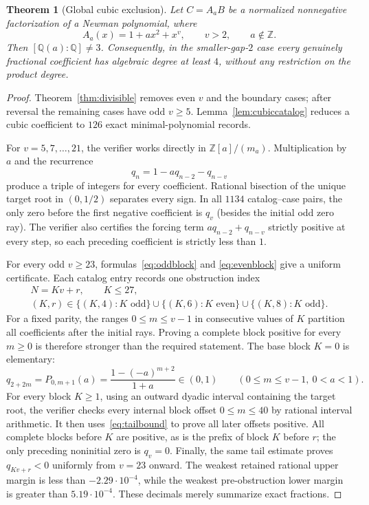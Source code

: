\documentclass[11pt]{article}
\newtheorem{theorem}{Theorem}[section]
\theoremstyle{remark}
\newcommand{\Q}{\mathbb Q}
\newcommand{\Z}{\mathbb Z}
\numberwithin{equation}{section}
\begin{document}
\begin{theorem}[Global cubic exclusion]\label{thm:globalcubic}
Let $C=A_aB$ be a normalized nonnegative factorization of a Newman polynomial,
where
\[
 A_a(x)=1+a x^2+x^v,\qquad v>2,\qquad a\notin\Z.
\]
Then $[\Q(a):\Q]\ne3$.  Consequently, in the smaller-gap-$2$ case every
genuinely fractional coefficient has algebraic degree at least $4$, without
any restriction on the product degree.
\end{theorem}
\begin{proof}
Theorem~\ref{thm:divisible} removes even $v$ and the boundary cases; after
reversal the remaining cases have odd $v\ge5$.  Lemma~\ref{lem:cubiccatalog}
reduces a cubic coefficient to $126$ exact minimal-polynomial records.

For $v=5,7,\ldots,21$, the verifier works directly in
$\Z[a]/(m_a)$.  Multiplication by $a$ and the recurrence
\[
 q_n=1-aq_{n-2}-q_{n-v}
\]
produce a triple of integers for every coefficient.  Rational bisection of
the unique target root in $(0,1/2)$ separates every sign.  In all $1134$
catalog--case pairs, the only zero before the first negative coefficient is
$q_v$ (besides the initial odd zero ray).  The verifier also certifies the
forcing term $a q_{n-2}+q_{n-v}$ strictly positive at every step, so each
preceding coefficient is strictly less than $1$.

For every odd $v\ge23$, formulas~\eqref{eq:oddblock} and
\eqref{eq:evenblock} give a uniform certificate.  Each catalog entry records
one obstruction index
\[
\begin{gathered}
 N=Kv+r,\qquad K\le27,\\
 (K,r)\in\{(K,4):K\text{ odd}\}\cup
 \{(K,6):K\text{ even}\}\cup
 \{(K,8):K\text{ odd}\}.
\end{gathered}
\]
For a fixed parity, the ranges $0\le m\le v-1$ in consecutive values of $K$
partition all coefficients after the initial rays.  Proving a complete block
positive for every $m\ge0$ is therefore stronger than the required statement.
The base block $K=0$ is elementary:
\[
 q_{2+2m}=P_{0,m+1}(a)=\frac{1-(-a)^{m+2}}{1+a}\in(0,1)
 \qquad(0\le m\le v-1,\ 0<a<1).
\]
For every block $K\ge1$, using an outward dyadic interval containing the
target root, the verifier checks every internal block offset $0\le m\le40$ by
rational interval arithmetic.  It then uses~\eqref{eq:tailbound} to prove all
later offsets positive.  All complete blocks before $K$ are positive, as is
the prefix of block $K$ before $r$; the only preceding noninitial zero is
$q_v=0$.
Finally, the same tail estimate proves $q_{Kv+r}<0$ uniformly from $v=23$
onward.  The weakest retained rational upper margin is less than
$-2.29\cdot10^{-4}$, while the weakest pre-obstruction lower margin is greater
than $5.19\cdot10^{-4}$.  These decimals merely summarize exact fractions.


\end{proof}
\end{document}
